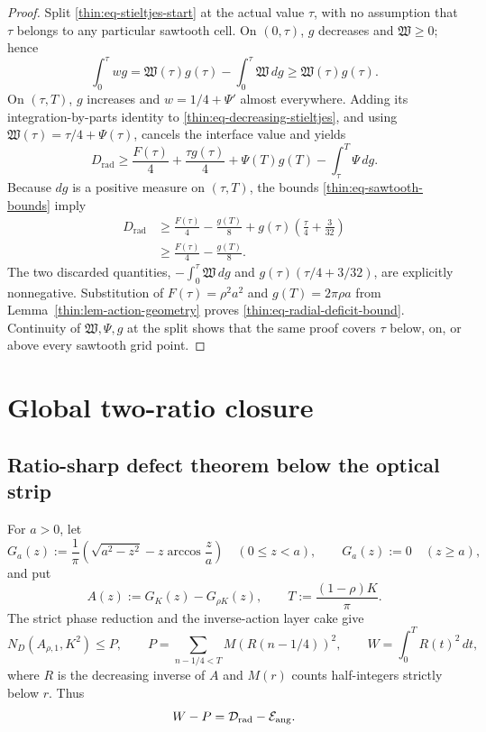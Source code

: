 \documentclass[11pt]{article}
\numberwithin{equation}{section}
\theoremstyle{definition}
\theoremstyle{remark}
\begin{document}
\begin{proof}
Split \eqref{thin:eq-stieltjes-start} at the actual value \(\tau\), with
no assumption that \(\tau\) belongs to any particular sawtooth cell.  On
\((0,\tau)\), \(g\) decreases and \(\mathfrak W\geq0\); hence
\begin{equation}
  \int_0^\tau wg
  =\mathfrak W(\tau)g(\tau)-\int_0^\tau \mathfrak W\,dg
  \geq \mathfrak W(\tau)g(\tau).
  \label{thin:eq-decreasing-stieltjes}
\end{equation}
On \((\tau,T)\), \(g\) increases and \(w=1/4+\Psi'\) almost everywhere.
Adding its integration-by-parts identity to
\eqref{thin:eq-decreasing-stieltjes}, and using
\(\mathfrak W(\tau)=\tau/4+\Psi(\tau)\), cancels the interface value and
yields
\[
  D_{\mathrm{rad}}
  \geq \frac{F(\tau)}4+\frac{\tau g(\tau)}4
     +\Psi(T)g(T)-\int_\tau^T\Psi\,dg.
\]
Because \(dg\) is a positive measure on \((\tau,T)\), the bounds
\eqref{thin:eq-sawtooth-bounds} imply
\[
\begin{aligned}
  D_{\mathrm{rad}}
  &\geq \frac{F(\tau)}4-\frac{g(T)}8
    +g(\tau)\left(\frac\tau4+\frac3{32}\right) \\
  &\geq \frac{F(\tau)}4-\frac{g(T)}8.
\end{aligned}
\]
The two discarded quantities,
\(-\int_0^\tau \mathfrak W\,dg\) and
\(g(\tau)(\tau/4+3/32)\), are explicitly nonnegative.  Substitution of
\(F(\tau)=\rho^2a^2\) and \(g(T)=2\pi\rho a\) from
Lemma~\ref{thin:lem-action-geometry} proves
\eqref{thin:eq-radial-deficit-bound}.  Continuity of
\(\mathfrak W,\Psi,g\) at the
split shows that the same proof covers \(\tau\) below, on, or above every
sawtooth grid point.
\end{proof}


\section{Global two-ratio closure}
\label{sec:global-two-owner}

\subsection{Ratio-sharp defect theorem below the optical strip}

For $a>0$, let
\[
 G_a(z):=\frac1\pi\left(\sqrt{a^2-z^2}
 -z\arccos\frac za\right)\quad(0\leq z<a),
 \qquad G_a(z):=0\quad(z\geq a),
\]
and put
\[
 A(z):=G_K(z)-G_{\rho K}(z),
 \qquad T:=\frac{(1-\rho)K}{\pi}.
\]
The strict phase reduction and the inverse-action layer cake give
\begin{equation}
 N_D(A_{\rho,1},K^2)\leq P,\qquad
 P=\sum_{n-1/4<T}M(R(n-1/4))^2,\qquad
 W=\int_0^TR(t)^2\,dt,
 \label{rs-summary:eq:layer-cake}
\end{equation}
where $R$ is the decreasing inverse of $A$ and $M(r)$ counts
half-integers strictly below $r$.  Thus
\[
 W-P=\mathcal D_{\rm rad}-\mathcal E_{\rm ang}.
\]
\end{document}

